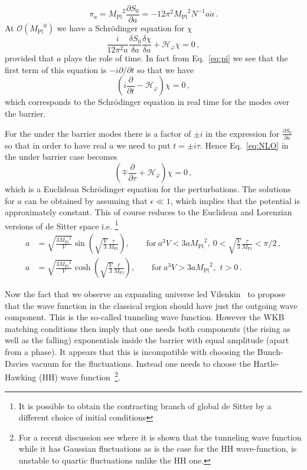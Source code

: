 \documentclass[a4paper,11pt]{article}
\numberwithin{equation}{section}
\newcommand{\mpl}{{M_{\mathrm{Pl}}}}
\numberwithin{equation}{section}
\begin{document}
\begin{equation}
\pi_a=\mpl^2\frac{\partial S_0}{\partial a}=-12\pi^2\mpl^2N^{-1}a\dot a \,.\label{eq:pi}
\end{equation} 
At $\mathcal{O}(\mpl^0)$ we have a Schr\"odinger equation for $\chi$
\begin{equation}
\frac{i}{12\pi^2 a} \frac{\delta S_0	}{\delta a}\frac{\delta\chi}{\delta a}+\mathcal{H}_\varphi\chi=0 \,, \label{eq:NLO}
\end{equation}
provided that $a$ plays the role of time. In fact from Eq.~\eqref{eq:pi} we see that the first term of this equation is 
$-i\partial /\partial t$ so that we have 
\begin{equation}
\left(i\frac{\partial}{\partial t}-\mathcal{H}_\varphi\right)\chi=0 \,, \label{eq:Schrodinger}
\end{equation}
which corresponds to the Schr\"odinger equation in real time for the modes over the barrier.

For the under the barrier modes there is a factor of $\pm i$ in the expression for $\frac{\partial S_0}{\partial a}$ so that in order to have real $a$ we need to put $t=\pm i \tau$.  Hence Eq.~\eqref{eq:NLO} in the under barrier case becomes
\begin{equation}
\left(\mp\frac{\partial}{\partial \tau}+\mathcal{H}_\varphi\right)\chi=0 \,, \label{eq:EucSchrodinger}
\end{equation}
which is a Euclidean  Schr\"odinger equation for the perturbations. The solutions for $a$ can be obtained by assuming that $\epsilon\ll 1$, which implies that the potential is approximately constant. This of course  reduces to the Euclidean and Lorenzian versions of de Sitter space i.e. \footnote{It is possible to obtain the contracting branch of global de Sitter by a different choice of initial conditions}
\begin{align}
a&= \sqrt{\frac{3\mpl^2}{V}}\sin{\left(\sqrt{\frac{V}{3}}\frac{\tau}{\mpl}\right)},\qquad\mathrm{for}\ a^3V<3a\mpl^2,~0<\sqrt{\frac{V}{3}}\frac{\tau}{\mpl}<\pi/2 \,,\label{eq:a_underthebarrier}\\
a&= \sqrt{\frac{3\mpl^2}{V}}\cosh{\left(\sqrt{\frac{V}{3}}\frac{t}{\mpl}\right)},\qquad\mathrm{for}\ a^3V>3a\mpl^2,\,~t>0 \,.
\label{eq:a_overthebarrier}
\end{align}

 Now the fact that we observe an expanding universe led Vilenkin~\cite{Vilenkin:1986cy} to propose that the wave function in the classical region should have just the outgoing wave component. This is the so-called tunneling wave function. However the WKB matching conditions then imply that one needs both components (the rising as well as the falling) exponentials inside the barrier with equal amplitude (apart from a phase). It appears that this is incompatible with choosing the Bunch-Davies vacuum for the fluctuations. Instead one needs to choose the Hartle-Hawking (HH) wave function~\cite{Hartle:1983ai}\footnote{For a recent discussion see \cite{deAlwis:2018sec, DiTucci:2019bui}  where it is shown that the tunneling wave function while it has Gaussian fluctuations as is the case for the HH wave-function, is unstable to quartic fluctuations unlike the HH one.}.
\end{document}
